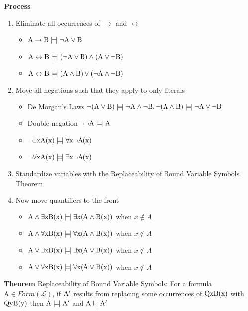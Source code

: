 \documentclass[11pt,notitlepage]{report}
\newcommand{\mc}[1]{\ensuremath{\mathcal{#1}}}
\newcommand{\mr}[1]{\ensuremath{\mathrm{#1}}}
\newcommand{\tbf}[1]{\textbf{#1}}
\newcommand{\modelsm}{\mathrel{\models\!\rvert}}
\newcommand{\vdashv}{\mathrel{\vdash\!\rvert}}
\begin{document}
\tbf{Process} 
\begin{enumerate}
    \item Eliminate all occurrences of $\to$ and $\leftrightarrow$
    \begin{itemize}
        \item $\rm A \to B \modelsm \neg A \vee B$
        \item $\rm A \leftrightarrow B \modelsm (\neg A \vee B) \wedge (A \vee \neg B)$
        \item $\rm A \leftrightarrow B \modelsm (A \wedge B) \vee (\neg A \wedge \neg B)$
    \end{itemize}
    \item Move all negations such that they apply to only literals
    \begin{itemize}
        \item De Morgan's Laws $\rm \neg (A \vee B) \modelsm \neg A \wedge \neg B, \neg (A \wedge B) \modelsm \neg A \vee \neg B$
        \item Double negation $\rm \neg \neg A \modelsm A$
        \item $\rm \neg \exists x A(x) \modelsm \forall x \neg A(x)$
        \item $\rm \neg \forall x A(x) \modelsm \exists x \neg A(x)$
    \end{itemize}
    \item Standardize variables with the Replaceability of Bound Variable Symbols Theorem
    \item Now move quantifiers to the front
    \begin{itemize}
        \item $\rm A \wedge \exists x B(x) \modelsm \exists x(A \wedge B(x))$ when $x \not \in A$
        \item $\rm A \wedge \forall x B(x) \modelsm \forall x(A \wedge B(x))$ when $x \not \in A$
        \item $\rm A \vee \exists x B(x) \modelsm \exists x(A \vee B(x))$ when $x \not \in A$
        \item $\rm A \vee \forall x B(x) \modelsm \forall x(A \vee B(x))$ when $x \not \in A$
    \end{itemize}
\end{enumerate}

\tbf{Theorem} Replaceability of Bound Variable Symbols: For a formula $\mr{A} \in Form(\mc L)$, if $\rm A'$ results from replacing some occurrences of $\rm QxB(x)$ with $\rm QyB(y)$ then $\rm A \modelsm A'$ and $\rm A \vdashv A'$ 
\end{document}
